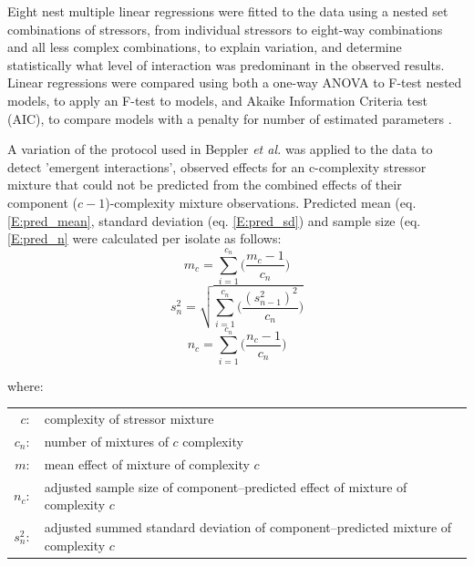 \documentclass[final,1p,times]{elsarticle}
\begin{document}
Eight nest multiple linear regressions were fitted to the data using a nested set combinations of stressors, from individual stressors to eight-way combinations and all less complex combinations, to explain variation, and determine statistically what level of interaction was predominant in the observed results. Linear regressions were compared using both a one-way ANOVA to F-test nested models, to apply an F-test to models, and Akaike Information Criteria test (AIC), to compare models with a penalty for number of estimated parameters \cite{Akaike1974}. 

A variation of the protocol used in Beppler \textit{et al.} \cite{Beppler2016} was applied to the data to detect 'emergent interactions', observed effects for an c-complexity stressor mixture that could not be predicted from the combined effects of their component ($c-1$)-complexity mixture observations. Predicted mean (eq. \ref{E:pred_mean}, standard deviation (eq. \ref{E:pred_sd}) and sample size (eq. \ref{E:pred_n} were calculated per isolate as follows: 
\begin{equation}
    m_c = \sum_{i = 1}^{c_n}\Big(\frac{m_c-1}{c_n}\Big)
\label{E:pred_mean}    
\end{equation}
\begin{equation}
    s^2_n = \sqrt{\sum_{i = 1}^{c_n}\bigg(\frac{(s^2_{n-1})^2}{c_n}\bigg)}
\label{E:pred_sd}    
\end{equation}
\begin{equation}
    n_c = \sum_{i = 1}^{c_n}\Big(\frac{n_c-1}{c_n}\Big)
\label{E:pred_n}    
\end{equation}

\mbox{where:}

\begin{small}
\setlength{\tabcolsep}{1pt}
\begin{tabular}{r p{11cm}}
    $c :$ & complexity of stressor mixture \\
    $c_n :$ & number of mixtures of $c$ complexity \\
    $m :$ & mean effect of mixture of complexity $c$ \\
    $n_c :$ & adjusted sample size of component--predicted effect of mixture of complexity $c$ \\
    $s^2_n :$ & adjusted summed standard deviation of component--predicted mixture of complexity $c$ \\
\end{tabular}
\end{small}
\end{document}
